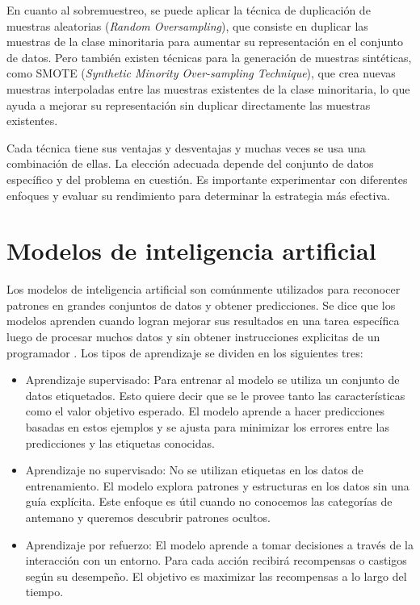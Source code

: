 En cuanto al sobremuestreo, se puede aplicar la técnica de duplicación de muestras aleatorias (\textit{Random Oversampling}), que consiste en duplicar las muestras de la clase minoritaria para aumentar su representación en el conjunto de datos. Pero también existen técnicas para la generación de muestras sintéticas, como SMOTE (\textit{Synthetic Minority Over-sampling Technique}), que crea nuevas muestras interpoladas entre las muestras existentes de la clase minoritaria, lo que ayuda a mejorar su representación sin duplicar directamente las muestras existentes. 

Cada técnica tiene sus ventajas y desventajas y muchas veces se usa una combinación de ellas. La elección adecuada depende del conjunto de datos específico y del problema en cuestión. Es importante experimentar con diferentes enfoques y evaluar su rendimiento para determinar la estrategia más efectiva.


\section{Modelos de inteligencia artificial}

Los modelos de inteligencia artificial son comúnmente utilizados para reconocer patrones en grandes conjuntos de datos y obtener predicciones. Se dice que los modelos aprenden cuando logran mejorar sus resultados en una tarea específica luego de procesar muchos datos y sin obtener instrucciones explicitas de un programador \citep{ARTICULO2}. 
Los tipos de aprendizaje se dividen en los siguientes tres:
\begin{itemize}
\item Aprendizaje supervisado: Para entrenar al modelo se utiliza un conjunto de datos etiquetados. Esto quiere decir que se le provee tanto las características como el valor objetivo esperado. El modelo aprende a hacer predicciones basadas en estos ejemplos y se ajusta para minimizar los errores entre las predicciones y las etiquetas conocidas.
\item Aprendizaje no supervisado: No se utilizan etiquetas en los datos de entrenamiento. El modelo explora patrones y estructuras en los datos sin una guía explícita. Este enfoque es útil cuando no conocemos las categorías de antemano y queremos descubrir patrones ocultos.
\item Aprendizaje por refuerzo: El modelo aprende a tomar decisiones a través de la interacción con un entorno. Para cada acción recibirá recompensas o castigos según su desempeño. El objetivo es maximizar las recompensas a lo largo del tiempo.
\end{itemize}

